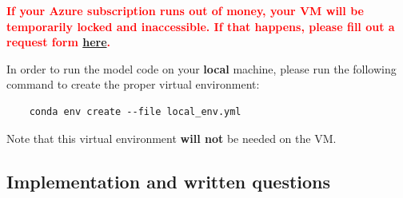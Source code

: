 \textbf{\textcolor{red}{If your Azure subscription runs out of money, your VM will be temporarily locked and inaccessible. If that happens, please fill out a request form \href{https://forms.gle/PUwiA1rR5aQNWxYt6}{here}.}}

In order to run the model code on your \textbf{local} machine, please run the following command to create the proper virtual environment:

\begin{lstlisting}
    conda env create --file local_env.yml
\end{lstlisting}

Note that this virtual environment \textbf{will not} be needed on the VM.\newline

\subsection*{Implementation and written questions}

